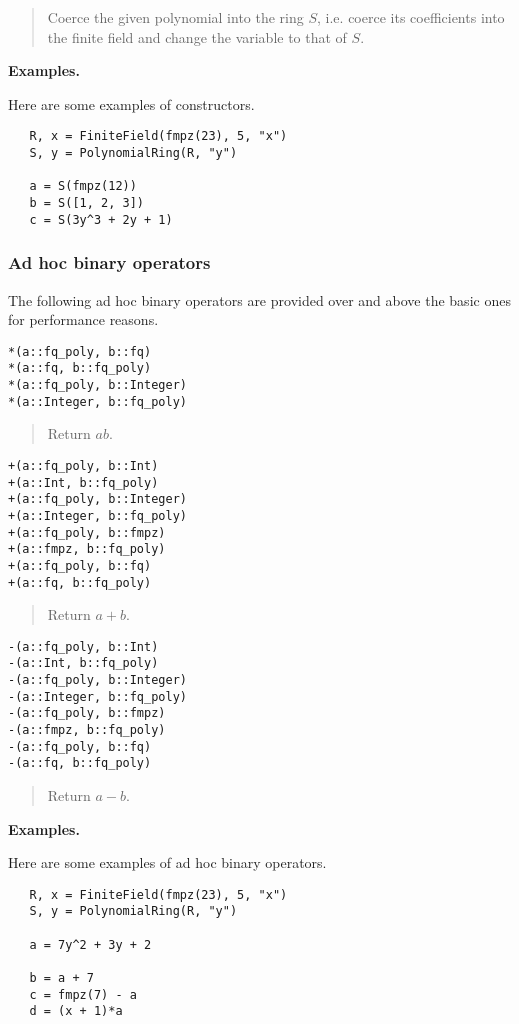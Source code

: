 \documentclass[a4paper,10pt]{article}
\newcommand{\desc}[1]{\vspace{-3mm}\begin{quote}#1\end{quote}}
\begin{document}
{{\desc{Coerce the given polynomial into the ring $S$, i.e. coerce its coefficients
into the finite field and change the variable to that of $S$.}

\textbf{Examples.}

Here are some examples of constructors.

\begin{lstlisting}
   R, x = FiniteField(fmpz(23), 5, "x")
   S, y = PolynomialRing(R, "y")

   a = S(fmpz(12))
   b = S([1, 2, 3])
   c = S(3y^3 + 2y + 1)
\end{lstlisting}

\subsubsection{Ad hoc binary operators}

The following ad hoc binary operators are provided over and above the basic ones
for performance reasons.

\begin{lstlisting}
*(a::fq_poly, b::fq)
*(a::fq, b::fq_poly)
*(a::fq_poly, b::Integer)
*(a::Integer, b::fq_poly)
\end{lstlisting}

\desc{Return $ab$.}

\begin{lstlisting}
+(a::fq_poly, b::Int)
+(a::Int, b::fq_poly)
+(a::fq_poly, b::Integer)
+(a::Integer, b::fq_poly)
+(a::fq_poly, b::fmpz)
+(a::fmpz, b::fq_poly)
+(a::fq_poly, b::fq)
+(a::fq, b::fq_poly)
\end{lstlisting}

\desc{Return $a + b$.}

\begin{lstlisting}
-(a::fq_poly, b::Int)
-(a::Int, b::fq_poly)
-(a::fq_poly, b::Integer)
-(a::Integer, b::fq_poly)
-(a::fq_poly, b::fmpz)
-(a::fmpz, b::fq_poly)
-(a::fq_poly, b::fq)
-(a::fq, b::fq_poly)
\end{lstlisting}

\desc{Return $a - b$.}

\textbf{Examples.}

Here are some examples of ad hoc binary operators.

\begin{lstlisting}
   R, x = FiniteField(fmpz(23), 5, "x")
   S, y = PolynomialRing(R, "y")

   a = 7y^2 + 3y + 2

   b = a + 7
   c = fmpz(7) - a
   d = (x + 1)*a
\end{lstlisting}

}}
\end{document}
